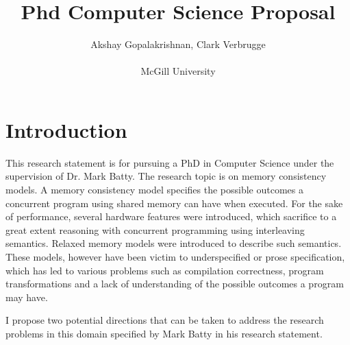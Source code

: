 \documentclass{article}
\title{Phd Computer Science Proposal}
\author{Akshay Gopalakrishnan, Clark Verbrugge \\ \\ McGill University}
\begin{document}
    \maketitle

    \section{Introduction}

            
        This research statement is for pursuing a PhD in Computer Science under the supervision of Dr. Mark Batty. 
        The research topic is on memory consistency models. 
        A memory consistency model specifies the possible outcomes a concurrent program using shared memory can have when executed. 
        For the sake of performance, several hardware features were introduced, which sacrifice to a great extent reasoning with concurrent programming using interleaving semantics. 
        Relaxed memory models were introduced to describe such semantics.  
        These models, however have been victim to underspecified or prose specification, which has led to various problems such as compilation correctness, program transformations and a lack of understanding of the possible outcomes a program may have. 

        I propose two potential directions that can be taken to address the research problems in this domain specified by Mark Batty \cite{Batty} in his research statement.
\end{document}
